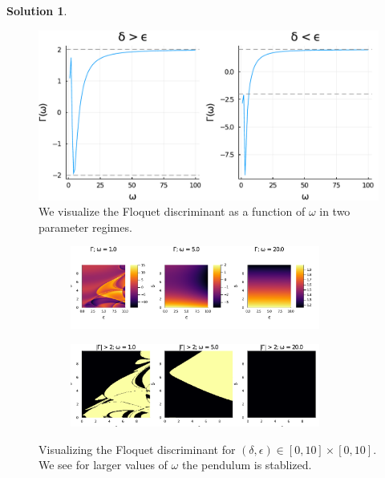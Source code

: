 \documentclass[12pt]{article}
\theoremstyle{definition}
\newtheorem{sol}{Solution}
\theoremstyle{remark}
\begin{document}
\begin{sol}
    \begin{figure}[b]
        \centering
        \includegraphics[width=0.8\linewidth]{figs/hw-7-exer-Floquet-omega.pdf}
        \caption{We visualize the Floquet discriminant as a function of $\omega$ in two parameter regimes.}%
        \label{fig:floquet-omega}
    \end{figure}

    \begin{figure}[b]
     \centering
     \begin{subfigure}{\linewidth}
         \centering
         \includegraphics[width=0.9\textwidth]{../hw/figs/hw-7-exer-Floquet-heatmap.pdf}
     \end{subfigure}
     \hfill
     \begin{subfigure}{\linewidth}
         \centering
         \includegraphics[width=0.9\textwidth]{../hw/figs/hw-7-exer-Floquet-binary.pdf}
     \end{subfigure}
     \hfill
     \caption{Visualizing the Floquet discriminant for $(\delta, \epsilon) \in [0, 10] \times [0, 10]$. We see for larger values of $\omega$ the pendulum is stablized.}
     \label{fig:floquet-heat}
\end{figure}

\end{sol}
\end{document}
